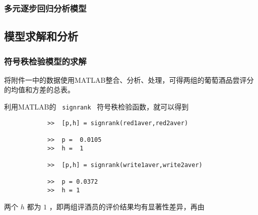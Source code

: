 \documentclass[nocover]{cumcmart}%
\begin{document}
        \subsubsection{多元逐步回归分析模型}




    \subsection{模型求解和分析}

        \subsubsection{符号秩检验模型的求解}
        将附件一中的数据使用MATLAB整合、分析、处理，可得两组的葡萄酒品尝评分的均值和方差的总表。

        利用MATLAB的 \verb| signrank | 符号秩检验函数，就可以得到
        \begin{verbatim}
            >>  [p,h] = signrank(red1aver,red2aver)

            >>  p =  0.0105
            >>  h =  1

            >>  [p,h] = signrank(write1aver,write2aver)

            >>  p = 0.0372
            >>  h = 1

        \end{verbatim}

        两个 $h$ 都为 $1$ ，即两组评酒员的评价结果均有显著性差异，再由
\end{document}
